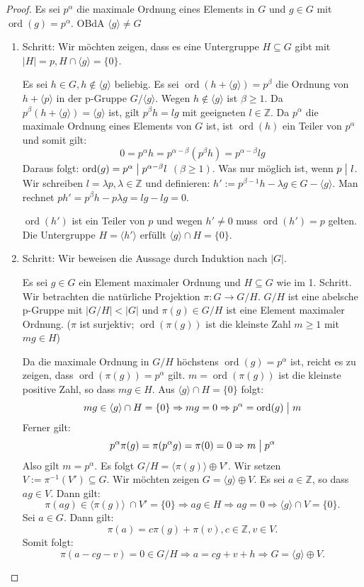 \documentclass[12pt]{scrartcl} %
\DeclareMathOperator{\ord}{ord}
\newcommand{\divides}{\bigm|}
\theoremstyle{definition}
\theoremstyle{remark}
\begin{document}
\begin{proof}
Es sei $p^{\alpha}$ die maximale Ordnung eines Elements in $G$ und $g\in G$ mit $\ord(g)=p^{\alpha}$. OBdA $\langle g\rangle \neq G$ 
\begin{enumerate}
\item Schritt: Wir möchten zeigen, dass es eine Untergruppe $H\subseteq G$ gibt mit $|H|=p, H\cap \langle g\rangle =\{ 0\}$.

Es sei $h \in G,h\notin \langle g \rangle$ beliebig.
Es sei $\ord(h+\langle g\rangle)=p^{\beta}$ die Ordnung von $h+\langle p\rangle$ in der p-Gruppe $G/\langle g\rangle$.
Wegen $h\notin \langle g\rangle$ ist $\beta\geq1$. 
Da $p^{\beta}(h+\langle g\rangle)=\langle g\rangle$ ist, gilt $p^{\beta}h=lg$ mit geeigneten $l\in \mathbb{Z}$. 
Da $p^{\alpha}$ die maximale Ordnung eines Elements von $G$ ist, ist $\ord(h)$ ein Teiler von $p^{\alpha}$ und somit gilt:
\[ 0=p^{\alpha}h=p^{\alpha -\beta}(p^{\beta}h)=p^{\alpha -\beta}lg\]
Daraus folgt: $ \ord(g)=p^{\alpha} \divides p^{\alpha -\beta}l$ $(\beta \geq 1)$. 
Was nur möglich ist, wenn $p \divides l$. 
Wir schreiben $l=\lambda p, \lambda \in \mathbb{Z}$ und definieren: $h':=p^{\beta -1}h-\lambda g \in G - \langle g \rangle.$ Man rechnet $ ph' = p^{\beta}h - p \lambda g =lg-lg=0$.

$\ord(h')$ ist ein Teiler von $p$ und wegen $h'\neq 0$ muss $\ord(h')=p$ gelten. 
Die Untergruppe $H=\langle h'\rangle$ erfüllt $\langle g\rangle \cap H=\{ 0\}$.
\item Schritt: Wir beweisen die Aussage durch Induktion nach $|G|$.

Es sei $g\in G$ ein Element maximaler Ordnung und $H\subseteq G$ wie im 1. Schritt. 
Wir betrachten die natürliche Projektion $\pi :G\rightarrow G/H$. 
$G/H$ ist eine abelsche p-Gruppe mit $|G/H|<|G|$ und $\pi (g)\in G/H$ ist eine Element maximaler Ordnung.
($\pi$ ist surjektiv; $\ord(\pi (g))$ ist die kleinste Zahl $m\geq 1$ mit $mg\in H$)

Da die maximale Ordnung in $G/H$ höchstens $\ord(g)=p^{\alpha}$ ist, reicht es zu zeigen, dass $\ord(\pi (g))=p^{\alpha}$ gilt.
$m=\ord(\pi (g))$ ist die kleinste positive Zahl, so dass $mg\in H$. Aus $\langle g\rangle \cap H=\{ 0\}$ folgt:
\[ mg\in \langle g\rangle \cap H=\{ 0\} \Rightarrow mg=0 \Rightarrow p^{\alpha}=\ord(g) \divides m\]
Ferner gilt:
\[ p^{\alpha}\pi (g)=\pi (p^{\alpha}g)=\pi(0) =0\Rightarrow m \divides p^{\alpha}\]
Also gilt $m=p^{\alpha}$. Es folgt $G/H=\langle \pi (g)\rangle \oplus V'$. 
Wir setzen $V := \pi ^{-1}(V') \subseteq G$. Wir möchten zeigen $G=\langle g\rangle \oplus V$. Es sei $a\in \mathbb{Z}$, so dass $ag\in V$. Dann gilt:
\[ \pi (ag)\in \langle \pi (g)\rangle\ \cap V'=\{ 0\}\Rightarrow ag\in H\Rightarrow ag=0\Rightarrow \langle g\rangle \cap V=\{ 0\}.\]
Sei $a\in G$. Dann gilt:
\[ \pi (a)=c\pi (g)+\pi (v),c\in \mathbb{Z}, v\in V.\]
Somit folgt:
\[ \pi (a-cg-v )=0\in G/H\Rightarrow a=cg+v+h\Rightarrow G = \langle g\rangle \oplus V.\]
\qedhere
\end{enumerate} 
\end{proof}
\end{document}
